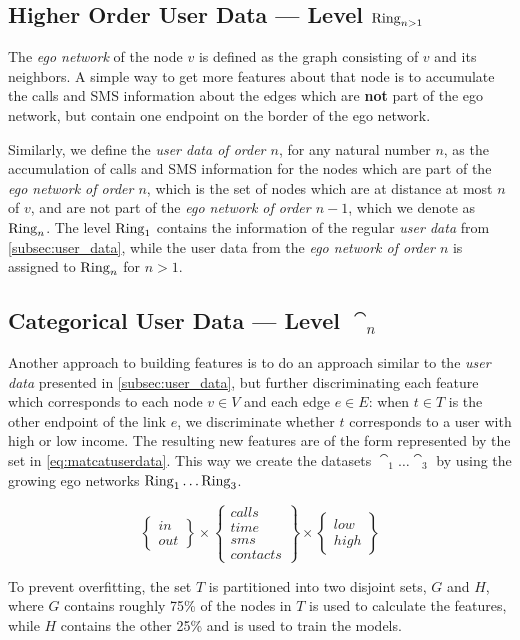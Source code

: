 \subsection{Higher Order User Data --- Level $\operatorname{Ring}_{n > 1}$}

\label{subsec:higherorderuserdata}

The \emph{ego network} of the node $v$ is defined as the graph consisting of $v$ and its neighbors. A simple way to get more features about that node is to accumulate the calls and SMS information about the edges which are \textbf{not} part of the ego network, but contain one endpoint on the border of the ego network.

Similarly, we define the \emph{user data of order $n$}, for any natural number $n$, as the accumulation of calls and SMS information for the nodes which are part of the \emph{ego network of order $n$}, which is the set of nodes which are at distance at most $n$ of $v$, and are not part of the \emph{ego network of order $n - 1$},
which we denote as $\operatorname{Ring}_n$. 
The level $\operatorname{Ring}_1$ contains the information of the regular \emph{user data} from \cref{subsec:user_data}, while the user data from the \emph{ego network of order $n$} is assigned to $\operatorname{Ring}_n$ for $n > 1$.

\subsection{Categorical User Data --- Level $\cat_n$}
\label{subsec:categoricaluserdata}

Another approach to building features is to do an approach similar to the \emph{user data} presented in \cref{subsec:user_data}, but further discriminating each feature which corresponds to each node $v \in V$ and each edge $e \in E$:
when $t \in T$ is the other endpoint of the link $e$, we discriminate whether $t$ corresponds to a user with high or low income. 
The resulting new features are of the form represented by the set in \cref{eq:matcatuserdata}. This way we create the datasets $\cat_1 \dots \cat_3$ by using the growing ego networks $\operatorname{Ring}_1 \dots \operatorname{Ring}_3$.

\begin{equation}
\begin{Bmatrix} in \\ out \end{Bmatrix}
\times
\begin{Bmatrix} calls \\ time \\ sms \\ contacts \end{Bmatrix}
\times
\begin{Bmatrix} low \\ high \end{Bmatrix}
\label{eq:matcatuserdata}
\end{equation}

To prevent overfitting, the set $T$ is partitioned into two disjoint sets, $G$ and $H$, where $G$ contains roughly 75\% of the nodes in $T$ is used to calculate the features, while $H$ contains the other 25\% and is used to train the models.
